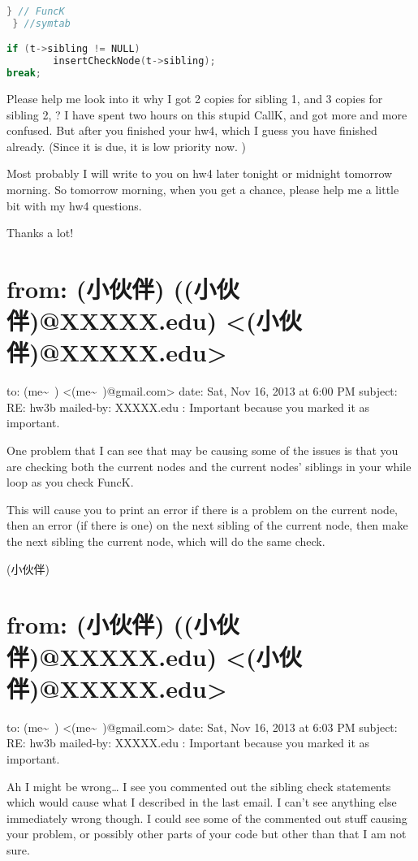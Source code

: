 \documentclass[12pt]{book}
\begin{document}
\begin{lstlisting}[language=c++]
        } // FuncK
 } //symtab

if (t->sibling != NULL)
        insertCheckNode(t->sibling);
break;

\end{lstlisting}

Please help me look into it why I got 2 copies for sibling 1, and 3 copies for sibling 2, ? I have spent two hours on this stupid CallK, and got more and more confused. 
But after you finished your hw4, which I guess you have finished already. (Since it is due, it is low priority now. )

Most probably I will write to you on hw4 later tonight or midnight tomorrow morning. So tomorrow morning, when you get a chance, please help me a little bit with my hw4 questions. 

Thanks a lot!

\section{from:         (小伙伴) ((小伙伴)@XXXXX.edu) <(小伙伴)@XXXXX.edu>}
\label{sec-38-4}
to:         (me\textasciitilde{}~) <(me\textasciitilde{}~)@gmail.com>
date:         Sat, Nov 16, 2013 at 6:00 PM
subject:         RE: hw3b
mailed-by:         XXXXX.edu
:         Important because you marked it as important.

One problem that I can see that may be causing some of the issues is that you are checking both the current nodes and the current nodes' siblings in your while loop as you check FuncK. 

This will cause you to print an error if there is a problem on the current node, then an error (if there is one) on the next sibling of the current node, then make the next sibling the current node, which will do the same check.

(小伙伴)

\section{from:         (小伙伴) ((小伙伴)@XXXXX.edu) <(小伙伴)@XXXXX.edu>}
\label{sec-38-5}
to:         (me\textasciitilde{}~) <(me\textasciitilde{}~)@gmail.com>
date:         Sat, Nov 16, 2013 at 6:03 PM
subject:         RE: hw3b
mailed-by:         XXXXX.edu
:         Important because you marked it as important.

Ah I might be wrong\ldots{} I see you commented out the sibling check statements which would cause what I described in the last email. I can't see anything else immediately wrong though. I could see some of the commented out stuff causing your problem, or possibly other parts of your code but other than that I am not sure.
\end{document}
